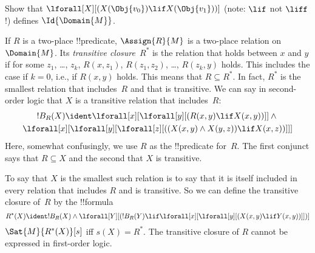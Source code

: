 \documentclass[../../../include/open-logic-section]{subfiles}
\begin{document}
\begin{prob}
Show that $\lforall[X][(X(\Obj{v_0}) \lif X(\Obj{v_1}))]$ (note:
$\lif$ not $\liff$!) defines $\Id{\Domain{M}}$.
\end{prob}

\begin{ex}
If $R$ is a two-place !!{predicate}, $\Assign{R}{M}$ is a two-place
relation on~$\Domain{M}$.  Its \emph{transitive closure}~$R^*$ is the
relation that holds between $x$ and $y$ if for some $z_1$, \dots,
$z_k$, $R(x,z_1)$, $R(z_1, z_2)$, \dots, $R(z_k,y)$ holds. This
includes the case if $k = 0$, i.e., if $R(x,y)$ holds. This means that
$R \subseteq R^*$. In fact, $R^*$ is the smallest relation that
includes~$R$ and that is transitive.  We can say in second-order logic
that $X$ is a transitive relation that includes~$R$:
\begin{multline*}
  !B_R(X) \ident \lforall[x][\lforall[y][(R(x,y) \lif X(x, y))]] \land {}\\
\lforall[x][\lforall[y][\lforall[z][((X(x,y) \land X(y,z)) \lif X(x,
      z))]]]
\end{multline*}
Here, somewhat confusingly, we use $R$ as the !!{predicate}
for~$R$. The first conjunct says that $R \subseteq X$ and the second
that $X$ is transitive.

To say that $X$ is the smallest such relation is to say that it is
itself included in every relation that includes $R$ and is
transitive. So we can define the transitive closure of~$R$ by the
!!{formula}
\[
R^*(X) \ident !B_R(X) \land \lforall[Y][(!B_R(Y) \lif
  \lforall[x][\lforall[y][(X(x, y) \lif Y(x,y))]])]
\]
$\Sat{M}{R^*(X)}[s]$ iff $s(X) = R^*$. The transitive closure of $R$
cannot be expressed in first-order logic.
\end{ex}
\end{document}
